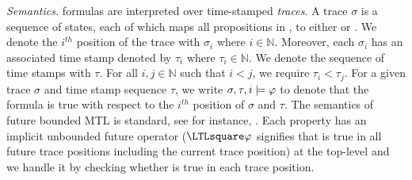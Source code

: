 \textit{Semantics. }
\planguage formulas are interpreted over time-stamped \emph{traces}. A trace $\sigma$ is a sequence of states, each of which maps all propositions in \sfmap, to either \true or \false. We denote the $i^{th}$ position of the trace with $\sigma_i$ where $i\in\mathbb{N}$. Moreover, each $\sigma_i$ has an associated time stamp denoted by $\tau_i$ where $\tau_i\in\mathbb{N}$.
We denote the sequence of time stamps with $\tau$. For all $i, j\in\mathbb{N}$ such that $i < j$, we require $\tau_i < \tau_j$. For a given trace $\sigma$ and time stamp sequence $\tau$, we write $\sigma, \tau, i\models\varphi$ to denote that the formula \policy is true with respect to the $i^{th}$ position of $\sigma$ and $\tau$.
The semantics of \planguage future bounded MTL is standard, see for instance, \cite{Basin2008}.
Each  property \policy has an implicit unbounded \henceforth future operator ($\henceforth\policy$ signifies that
\policy is true in all future trace positions including the current trace position) at the top-level and we handle it by
checking whether \policy is true in each trace position.

